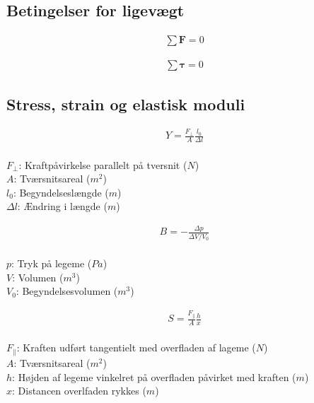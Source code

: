 \subsection{Betingelser for ligevægt}
	\begin{align}
		\sum\mathbf{F}=0
	\end{align}
	\Kraft

	\begin{align}
		\sum\boldsymbol{\tau}=0
	\end{align}
	\Kraftmom

\subsection{Stress, strain og elastisk moduli}
	\begin{align}
		Y=\frac{F_{\bot}}{A}\frac{l_0}{\Delta l}
	\end{align}
	\youngmod\\
	$F_{\bot}$: Kraftpåvirkelse parallelt på tversnit ($N$)\\
	$A$: Tværsnitsareal ($m^2$)\\
	$l_0$: Begyndelseslængde ($m$)\\
	$\Delta l$: Ændring i længde ($m$)

	\begin{align}
		B=-\frac{\Delta p}{\Delta V/V_0}
	\end{align}
	\bulkmod\\
	$p$: Tryk på legeme ($Pa$)\\
	$V$: Volumen ($m^3$)\\
	$V_0$: Begyndelsesvolumen ($m^3$)

	\begin{align}
		S=\frac{F_{\parallel}}{A}\frac{h}{x}
	\end{align}
	\shearmod\\
	$F_{\parallel}$: Kraften udført tangentielt med overfladen af lageme ($N$)\\
	$A$: Tværsnitsareal ($m^2$)\\
	$h$: Højden af legeme vinkelret på overfladen påvirket med kraften ($m$)\\
	$x$: Distancen overlfaden rykkes ($m$)